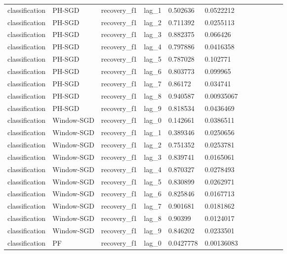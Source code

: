 \begin{tabular}{llllllllllll}
classification & PH-SGD & recovery\_f1 & lag\_1 & 0.502636 & 0.0522212 &  &  &  &  &  &  \\
classification & PH-SGD & recovery\_f1 & lag\_2 & 0.711392 & 0.0255113 &  &  &  &  &  &  \\
classification & PH-SGD & recovery\_f1 & lag\_3 & 0.882375 & 0.066426 &  &  &  &  &  &  \\
classification & PH-SGD & recovery\_f1 & lag\_4 & 0.797886 & 0.0416358 &  &  &  &  &  &  \\
classification & PH-SGD & recovery\_f1 & lag\_5 & 0.787028 & 0.102771 &  &  &  &  &  &  \\
classification & PH-SGD & recovery\_f1 & lag\_6 & 0.803773 & 0.099965 &  &  &  &  &  &  \\
classification & PH-SGD & recovery\_f1 & lag\_7 & 0.86172 & 0.034741 &  &  &  &  &  &  \\
classification & PH-SGD & recovery\_f1 & lag\_8 & 0.940587 & 0.00935067 &  &  &  &  &  &  \\
classification & PH-SGD & recovery\_f1 & lag\_9 & 0.818534 & 0.0436469 &  &  &  &  &  &  \\
classification & Window-SGD & recovery\_f1 & lag\_0 & 0.142661 & 0.0386511 &  &  &  &  &  &  \\
classification & Window-SGD & recovery\_f1 & lag\_1 & 0.389346 & 0.0250656 &  &  &  &  &  &  \\
classification & Window-SGD & recovery\_f1 & lag\_2 & 0.751352 & 0.0253781 &  &  &  &  &  &  \\
classification & Window-SGD & recovery\_f1 & lag\_3 & 0.839741 & 0.0165061 &  &  &  &  &  &  \\
classification & Window-SGD & recovery\_f1 & lag\_4 & 0.870327 & 0.0278493 &  &  &  &  &  &  \\
classification & Window-SGD & recovery\_f1 & lag\_5 & 0.830899 & 0.0262971 &  &  &  &  &  &  \\
classification & Window-SGD & recovery\_f1 & lag\_6 & 0.825846 & 0.0167713 &  &  &  &  &  &  \\
classification & Window-SGD & recovery\_f1 & lag\_7 & 0.901681 & 0.0181862 &  &  &  &  &  &  \\
classification & Window-SGD & recovery\_f1 & lag\_8 & 0.90399 & 0.0124017 &  &  &  &  &  &  \\
classification & Window-SGD & recovery\_f1 & lag\_9 & 0.846202 & 0.0233501 &  &  &  &  &  &  \\
classification & PF & recovery\_f1 & lag\_0 & 0.0427778 & 0.00136083 &  &  &  &  &  &  \\

\end{tabular}
